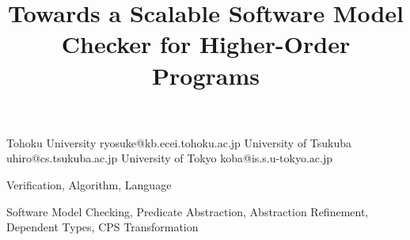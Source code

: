 \documentclass[preprint]{sigplanconf}
\begin{document}
\copyrightdata{[to be supplied]}

\title{Towards a Scalable Software Model Checker for Higher-Order Programs}

           {Tohoku University}
           {ryosuke@kb.ecei.tohoku.ac.jp}
           {University of Tsukuba}
           {uhiro@cs.tsukuba.ac.jp}
           {University of Tokyo}
           {koba@is.s.u-tokyo.ac.jp}

\maketitle




\terms
Verification, Algorithm, Language

\keywords
Software Model Checking, Predicate Abstraction, Abstraction Refinement,
Dependent Types, CPS Transformation


%













%
\end{document}
